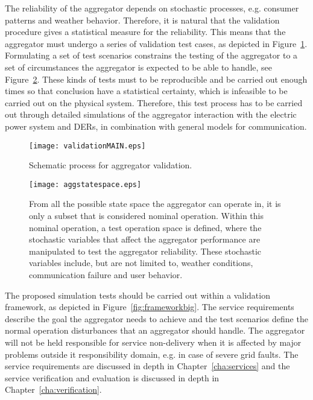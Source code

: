 The reliability of the aggregator depends on stochastic processes, e.g. consumer patterns and weather behavior. Therefore, it is natural that the validation procedure gives a statistical measure for the reliability. This means that the aggregator must undergo a series of validation test cases, as depicted in Figure~\ref{fig:MAINframework}. Formulating a set of test scenarios constrains the testing of the aggregator to a set of circumstances the aggregator is expected to be able to handle, see Figure~\ref{fig:aggstatespace}. These kinds of tests must to be reproducible and be carried out enough times so that conclusion have a statistical certainty, which is infeasible to be carried out on the physical system. Therefore, this test process has to be carried out through detailed simulations of the aggregator interaction with the electric power system and DERs, in combination with general models for communication.
\begin{figure}[htbp!]
\centering
\texttt{[image: validationMAIN.eps]}
\caption{Schematic process for aggregator validation.}
\label{fig:MAINframework}
\end{figure}

\begin{figure}[htpb!]
\centering
\texttt{[image: aggstatespace.eps]}
\caption{From all the possible state space the aggregator can operate in, it is only a subset that is considered nominal operation. Within this nominal operation, a test operation space is defined, where the stochastic variables that affect the aggregator performance are manipulated to test the aggregator reliability. These stochastic variables include, but are not limited to, weather conditions, communication failure and user behavior.}
\label{fig:aggstatespace}
\end{figure}

The proposed simulation tests should be carried out within a validation framework, as depicted in Figure~\ref{fig:frameworkbig}. The service requirements describe the goal the aggregator needs to achieve and the test scenarios define the normal operation disturbances that an aggregator should handle. The aggregator will not be held responsible for service non-delivery when it is affected by major problems outside it responsibility domain, e.g. in case of severe grid faults. The service requirements are discussed in depth in Chapter~\ref{cha:services} and the service verification and evaluation is discussed in depth in Chapter~\ref{cha:verification}.

